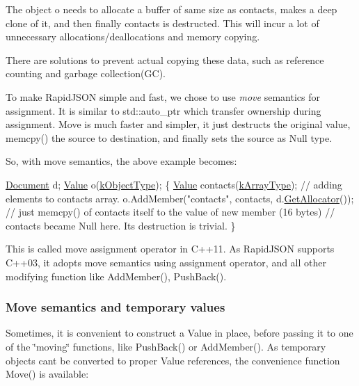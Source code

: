 The object {\ttfamily o} needs to allocate a buffer of same size as contacts, makes a deep clone of it, and then finally contacts is destructed. This will incur a lot of unnecessary allocations/deallocations and memory copying.

There are solutions to prevent actual copying these data, such as reference counting and garbage collection(\+G\+C).

To make Rapid\+J\+S\+ON simple and fast, we chose to use {\itshape move} semantics for assignment. It is similar to {\ttfamily std\+::auto\+\_\+ptr} which transfer ownership during assignment. Move is much faster and simpler, it just destructs the original value, {\ttfamily memcpy()} the source to destination, and finally sets the source as Null type.

So, with move semantics, the above example becomes\+:


\begin{DoxyCode}
\hyperlink{class_generic_document}{Document} d;
\hyperlink{class_generic_value}{Value} o(\hyperlink{rapidjson_8h_a1d1cfd8ffb84e947f82999c682b666a7a146f46700e905e8df96a6a90b5c7640f}{kObjectType});
\{
    \hyperlink{class_generic_value}{Value} contacts(\hyperlink{rapidjson_8h_a1d1cfd8ffb84e947f82999c682b666a7af41527d6925efa3c5c3dadb23dfef7c8}{kArrayType});
    \textcolor{comment}{// adding elements to contacts array.}
    o.AddMember(\textcolor{stringliteral}{"contacts"}, contacts, d.\hyperlink{class_generic_document_aa4609d6b19f86aec1a6b96edf2c27686}{GetAllocator}());  \textcolor{comment}{// just memcpy() of contacts itself
       to the value of new member (16 bytes)}
    \textcolor{comment}{// contacts became Null here. Its destruction is trivial.}
\}
\end{DoxyCode}




This is called move assignment operator in C++11. As Rapid\+J\+S\+ON supports C++03, it adopts move semantics using assignment operator, and all other modifying function like {\ttfamily Add\+Member()}, {\ttfamily Push\+Back()}.\hypertarget{md_Cadriciel_Commun_Externe_RapidJSON_doc_tutorial.zh-cn_TemporaryValues}{}\subsubsection{Move semantics and temporary values}\label{md_Cadriciel_Commun_Externe_RapidJSON_doc_tutorial.zh-cn_TemporaryValues}
Sometimes, it is convenient to construct a Value in place, before passing it to one of the \char`\"{}moving\char`\"{} functions, like {\ttfamily Push\+Back()} or {\ttfamily Add\+Member()}. As temporary objects can\textquotesingle{}t be converted to proper Value references, the convenience function {\ttfamily Move()} is available\+:


